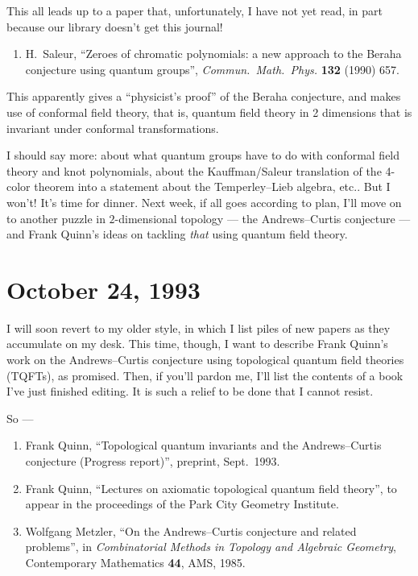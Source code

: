 \documentclass[12pt]{article}
\def\tightlist{}
\begin{document}
This all leads up to a paper that, unfortunately, I have not yet read,
in part because our library doesn't get this journal!

\begin{enumerate}
\def\labelenumi{\arabic{enumi})}
\setcounter{enumi}{4}
\tightlist
\item
  H.\ Saleur, ``Zeroes of chromatic polynomials: a new approach to the Beraha
  conjecture using quantum groups'', \emph{Commun.\ Math.\
  Phys.} \textbf{132} (1990) 657.
\end{enumerate}

This apparently gives a ``physicist's proof'' of the Beraha conjecture,
and makes use of conformal field theory, that is, quantum field theory
in 2 dimensions that is invariant under conformal transformations.

I should say more: about what quantum groups have to do with conformal
field theory and knot polynomials, about the Kauffman/Saleur translation
of the 4-color theorem into a statement about the Temperley--Lieb
algebra, etc.. But I won't! It's time for dinner. Next week, if all goes
according to plan, I'll move on to another puzzle in \(2\)-dimensional
topology --- the Andrews--Curtis conjecture --- and Frank Quinn's ideas on
tackling \emph{that} using quantum field theory.



\hypertarget{week23}{%
\section{October 24, 1993}\label{week23}}

I will soon revert to my older style, in which I list piles of new
papers as they accumulate on my desk. This time, though, I want to
describe Frank Quinn's work on the Andrews--Curtis conjecture using
topological quantum field theories (TQFTs), as promised. Then, if you'll
pardon me, I'll list the contents of a book I've just finished editing.
It is such a relief to be done that I cannot resist.

So ---

\begin{enumerate}
\def\labelenumi{\arabic{enumi})}
\item Frank Quinn,
  ``Topological quantum invariants and the Andrews--Curtis conjecture
  (Progress report)'', preprint, Sept.~1993.
\item
  Frank Quinn, ``Lectures on axiomatic topological quantum field theory'', to appear in the proceedings of the Park City Geometry
  Institute.
\item
  Wolfgang
  Metzler, ``On the Andrews--Curtis conjecture and related problems'', in \emph{Combinatorial Methods in Topology and Algebraic
  Geometry}, Contemporary Mathematics \textbf{44}, AMS, 1985.
\end{enumerate}
\end{document}
